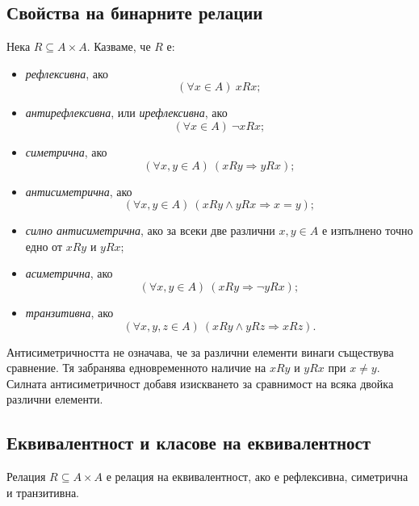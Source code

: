 \subsection{Свойства на бинарните релации}\label{s:1.5.1}

\begin{defn}
Нека $R\subseteq A\times A$. Казваме, че $R$ е:

\begin{itemize}
\item \emph{рефлексивна}, ако
\[
(\forall x\in A)\ xRx;
\]

\item \emph{антирефлексивна}, или \emph{ирефлексивна}, ако
\[
(\forall x\in A)\ \neg xRx;
\]

\item \emph{симетрична}, ако
\[
(\forall x,y\in A)\ (xRy\Rightarrow yRx);
\]

\item \emph{антисиметрична}, ако
\[
(\forall x,y\in A)\ (xRy\land yRx\Rightarrow x=y);
\]

\item \emph{силно антисиметрична}, ако за всеки две различни $x,y\in A$ е изпълнено точно едно от $xRy$ и $yRx$;

\item \emph{асиметрична}, ако
\[
(\forall x,y\in A)\ (xRy\Rightarrow\neg yRx);
\]

\item \emph{транзитивна}, ако
\[
(\forall x,y,z\in A)\ (xRy\land yRz\Rightarrow xRz).
\]
\end{itemize}
\end{defn}

Антисиметричността не означава, че за различни елементи винаги съществува сравнение. Тя забранява едновременното наличие на $xRy$ и $yRx$ при $x\neq y$. Силната антисиметричност добавя изискването за сравнимост на всяка двойка различни елементи.

\subsection{Еквивалентност и класове на еквивалентност}\label{s:1.5.2}

\begin{keydefn}
Релация $R\subseteq A\times A$ е релация на еквивалентност, ако е рефлексивна, симетрична и транзитивна.
\end{keydefn}

